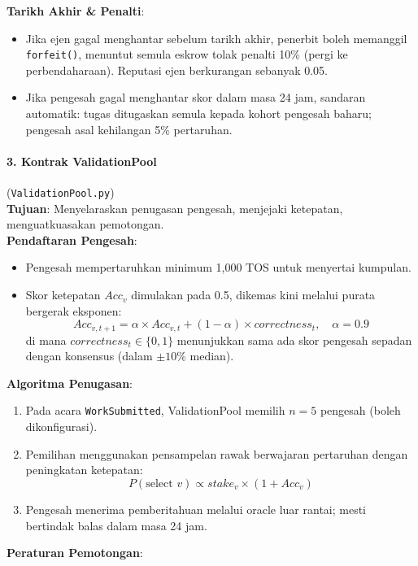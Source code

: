 \documentclass[11pt]{article}
\begin{document}
\textbf{Tarikh Akhir \& Penalti}:
\begin{itemize}[noitemsep]
  \item Jika ejen gagal menghantar sebelum tarikh akhir, penerbit boleh memanggil \texttt{forfeit()}, menuntut semula eskrow tolak penalti 10\% (pergi ke perbendaharaan). Reputasi ejen berkurangan sebanyak 0.05.
  \item Jika pengesah gagal menghantar skor dalam masa 24 jam, sandaran automatik: tugas ditugaskan semula kepada kohort pengesah baharu; pengesah asal kehilangan 5\% pertaruhan.
\end{itemize}

\paragraph{3. Kontrak ValidationPool} (\texttt{ValidationPool.py})\\
\textbf{Tujuan}: Menyelaraskan penugasan pengesah, menjejaki ketepatan, menguatkuasakan pemotongan.\\
\textbf{Pendaftaran Pengesah}:
\begin{itemize}[noitemsep]
  \item Pengesah mempertaruhkan minimum 1,000 TOS untuk menyertai kumpulan.
  \item Skor ketepatan $Acc_v$ dimulakan pada 0.5, dikemas kini melalui purata bergerak eksponen:
    \begin{equation}
    Acc_{v,t+1} = \alpha \times Acc_{v,t} + (1-\alpha) \times correctness_t, \quad \alpha = 0.9
    \end{equation}
    di mana $correctness_t \in \{0,1\}$ menunjukkan sama ada skor pengesah sepadan dengan konsensus (dalam $\pm10\%$ median).
\end{itemize}
\textbf{Algoritma Penugasan}:
\begin{enumerate}[noitemsep]
  \item Pada acara \texttt{WorkSubmitted}, ValidationPool memilih $n=5$ pengesah (boleh dikonfigurasi).
  \item Pemilihan menggunakan pensampelan rawak berwajaran pertaruhan dengan peningkatan ketepatan:
    \begin{equation}
    P(\text{select } v) \propto stake_v \times (1 + Acc_v)
    \end{equation}
  \item Pengesah menerima pemberitahuan melalui oracle luar rantai; mesti bertindak balas dalam masa 24 jam.
\end{enumerate}
\textbf{Peraturan Pemotongan}:
\end{document}
